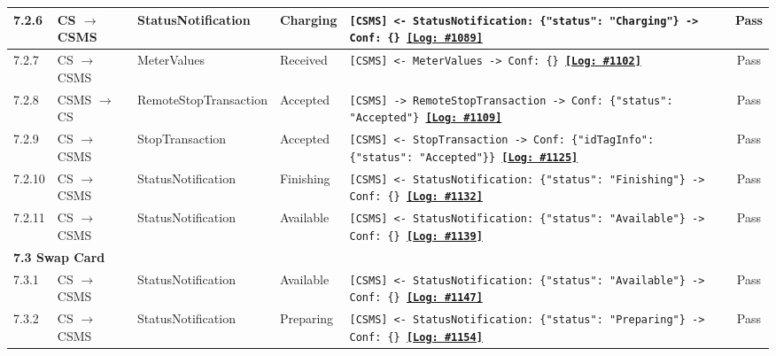 \documentclass[10pt, a4paper, landscape]{article}
\begin{document}
\begin{longtable}{|p{1.0cm}|p{2.5cm}|p{4.0cm}|p{5.0cm}|p{10.0cm}|c|}
\hline
7.2.6 & CS $\to$ CSMS & StatusNotification & Charging & \footnotesize\texttt{[CSMS] <- StatusNotification: \{"status": "Charging"\} \newline [CSMS] -> Conf: \{\} \newline \hyperref[log:7.2.6]{\textbf{[Log: \#1089]}}} & Pass \\
\hline
7.2.7 & CS $\to$ CSMS & MeterValues & Received & \footnotesize\texttt{[CSMS] <- MeterValues \newline [CSMS] -> Conf: \{\} \newline \hyperref[log:7.2.7]{\textbf{[Log: \#1102]}}} & Pass \\
\hline
7.2.8 & CSMS $\to$ CS & RemoteStopTransaction & Accepted & \footnotesize\texttt{[CSMS] -> RemoteStopTransaction \newline [CS] -> Conf: \{"status": "Accepted"\} \newline \hyperref[log:7.2.8]{\textbf{[Log: \#1109]}}} & Pass \\
\hline
7.2.9 & CS $\to$ CSMS & StopTransaction & Accepted & \footnotesize\texttt{[CSMS] <- StopTransaction \newline [CSMS] -> Conf: \{"idTagInfo": \{"status": "Accepted"\}\} \newline \hyperref[log:7.2.9]{\textbf{[Log: \#1125]}}} & Pass \\
\hline
7.2.10 & CS $\to$ CSMS & StatusNotification & Finishing & \footnotesize\texttt{[CSMS] <- StatusNotification: \{"status": "Finishing"\} \newline [CSMS] -> Conf: \{\} \newline \hyperref[log:7.2.10]{\textbf{[Log: \#1132]}}} & Pass \\
\hline
7.2.11 & CS $\to$ CSMS & StatusNotification & Available & \footnotesize\texttt{[CSMS] <- StatusNotification: \{"status": "Available"\} \newline [CSMS] -> Conf: \{\} \newline \hyperref[log:7.2.11]{\textbf{[Log: \#1139]}}} & Pass \\
\hline
\multicolumn{6}{|l|}{\textbf{7.3 Swap Card}} \\
\hline
7.3.1 & CS $\to$ CSMS & StatusNotification & Available & \footnotesize\texttt{[CSMS] <- StatusNotification: \{"status": "Available"\} \newline [CSMS] -> Conf: \{\} \newline \hyperref[log:7.3.1]{\textbf{[Log: \#1147]}}} & Pass \\
\hline
7.3.2 & CS $\to$ CSMS & StatusNotification & Preparing & \footnotesize\texttt{[CSMS] <- StatusNotification: \{"status": "Preparing"\} \newline [CSMS] -> Conf: \{\} \newline \hyperref[log:7.3.2]{\textbf{[Log: \#1154]}}} & Pass \\

\end{longtable}
\end{document}
